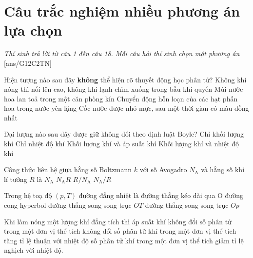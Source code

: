 \setcounter{section}{0}
\section{Câu trắc nghiệm nhiều phương án lựa chọn}
\textit{Thí sinh trả lời từ câu 1 đến câu 18. Mỗi câu hỏi thí sinh chọn một phương án}
\setcounter{ex}{0}
[ans/G12C2TN]
\begin{ex}
	Hiện tượng nào sau đây \textbf{không} thể hiện rõ thuyết động học phân tử?
	\choice
	{\True Không khí nóng thì nổi lên cao, không khí lạnh chìm xuống trong bầu khí quyển}
	{Mùi nước hoa lan toả trong một căn phòng kín}
	{Chuyển động hỗn loạn của các hạt phấn hoa trong nước yên lặng}
	{Cốc nước được nhỏ mực, sau một thời gian có màu đồng nhất}
\end{ex}
\begin{ex}
Đại lượng nào sau đây được giữ không đổi theo định luật Boyle?	
	\choice
	{Chỉ khối lượng khí}
	{Chỉ nhiệt độ khí}
	{Khối lượng khí và áp suất khí}
	{\True Khối lượng khí và nhiệt độ khí}
	\loigiai{}
\end{ex}
\begin{ex}
	Công thức liên hệ giữa hằng số Boltzmann $k$ với số Avogadro $N_\text{A}$ và hằng số khí lí tưởng $R$ là 
	\choice
	{$N_\text{A}$}
	{$N_\text{A}R$}
	{\True $R/N_\text{A}$}
	{$N_\text{A}/R$}
	\loigiai{}
\end{ex}
\begin{ex}
	Trong hệ toạ độ $\left(p, T\right)$ đường đẳng nhiệt là
	\choice
	{đường thẳng kéo dài qua O}
	{đường cong hyperbol}
	{đường thẳng song song trục $OT$}
	{\True đường thẳng song song trục $Op$}
	\loigiai{}
\end{ex}
\begin{ex}
	Khi làm nóng một lượng khí đẳng tích thì	
	\choice
	{áp suất khí không đổi}
	{\True số phân tử trong một đơn vị thể tích không đổi}
	{số phân tử khí trong một đơn vị thể tích tăng tỉ lệ thuận với nhiệt độ}
	{số phân tử khí trong một đơn vị thể tích giảm tỉ lệ nghịch với nhiệt độ.}
	\loigiai{}
\end{ex}
